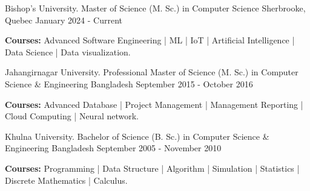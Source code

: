 



\begin{cventries}
   \cventry
    {Bishop's University.} %
    {Master of Science (M. Sc.) in Computer Science} %
    {Sherbrooke, Quebec} %
    {January 2024 - Current} %
    {
        \begin{cvitems} %
      \item {\textbf{Courses:} Advanced Software Engineering | ML | IoT | Artificial Intelligence | Data Science | Data visualization.}
       \end{cvitems}
     }
    
    \cventry
    {Jahangirnagar University.} %
    {Professional Master of Science (M. Sc.) in Computer Science \& Engineering} %
    {Bangladesh} %
    {September 2015 - October 2016} %
    {
        \begin{cvitems} %
      \item {\textbf{Courses:} Advanced Database | Project Management | Management Reporting | Cloud Computing | Neural network.}
       \end{cvitems}
    }
    
    \cventry
    {Khulna University.} %
    {Bachelor of Science (B. Sc.) in Computer Science \& Engineering} %
    {Bangladesh} %
    {September 2005 - November 2010} %
    {
        \begin{cvitems} %
      \item {\textbf{Courses:} Programming | Data Structure | Algorithm | Simulation | Statistics | Discrete Mathematics | Calculus.}
       \end{cvitems}
    }
\end{cventries}


